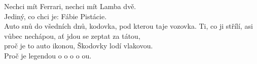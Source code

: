 \cho{}
Nechci mít Ferrari,
nechci mít Lamba dvě.\\
Jediný, co chci je:
Fábie Pistácie.\\
Auto snů do všedních dnů,
kodovka, pod kterou taje vozovka.
\ve{}
Ti, co ji střílí, asi vůbec nechápou,
ať jdou se zeptat za tátou,\\
proč je to auto ikonou,
Škodovky lodí vlakovou.\\
Proč je legendou o o o o ou.
\cho{}
\cho{}
\esong{}